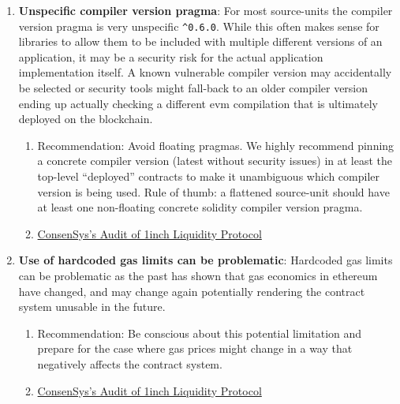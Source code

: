 \begin{enumerate}
\item\textbf{Unspecific compiler version pragma}: For most source-units the compiler version pragma is very unspecific \verb|^0.6.0|. While this often makes sense for libraries to allow them to be included with multiple different versions of an application, it may be a security risk for the actual application implementation itself. A known vulnerable compiler version may accidentally be selected or security tools might fall-back to an older compiler version ending up actually checking a different evm compilation that is ultimately deployed on the blockchain.
	\begin{enumerate}
	\item Recommendation: Avoid floating pragmas. We highly recommend pinning a concrete compiler version (latest without security issues) in at least the top-level “deployed” contracts to make it unambiguous which compiler version is being used. Rule of thumb: a flattened source-unit should have at least one non-floating concrete solidity compiler version pragma.
	\item\href{https://consensys.net/diligence/audits/2020/12/1inch-liquidity-protocol/\#unspecific-compiler-version-pragma}{ConsenSys's Audit of 1inch Liquidity Protocol}
	\end{enumerate}

\item\textbf{Use of hardcoded gas limits can be problematic}: Hardcoded gas limits can be problematic as the past has shown that gas economics in ethereum have changed, and may change again potentially rendering the contract system unusable in the future.
	\begin{enumerate}
	\item Recommendation: Be conscious about this potential limitation and prepare for the case where gas prices might change in a way that negatively affects the contract system.
	\item\href{https://consensys.net/diligence/audits/2020/12/1inch-liquidity-protocol/\#use-of-hardcoded-gas-limits-can-be-problematic}{ConsenSys's Audit of 1inch Liquidity Protocol}
	\end{enumerate}


\end{enumerate}
